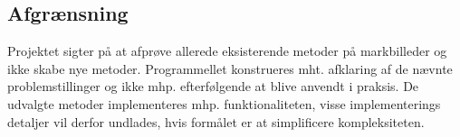 \subsection{Afgrænsning} \label{subsec:afg}
Projektet sigter på at afprøve allerede eksisterende metoder på markbilleder og ikke
skabe nye metoder. Programmellet konstrueres mht. afklaring af de nævnte problemstillinger
og ikke mhp. efterfølgende at blive anvendt i praksis. De udvalgte metoder implementeres mhp. funktionaliteten, visse implementerings detaljer vil derfor undlades, hvis formålet er at simplificere kompleksiteten.
